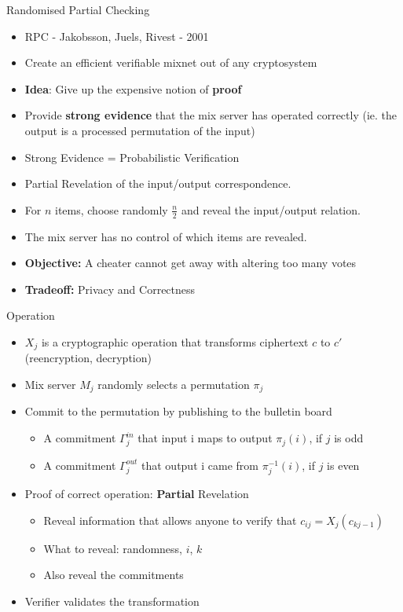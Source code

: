 \documentclass{beamer}
\begin{document}
\begin{frame}[allowframebreaks]{Randomised Partial Checking}

\begin{itemize}
\item RPC - Jakobsson, Juels, Rivest - 2001
\item Create an efficient verifiable mixnet out of any cryptosystem
\item \textbf{Idea}: Give up the expensive notion of \textbf{proof}
\item Provide \textbf{strong evidence} that the mix server has operated correctly (ie. the output is a processed permutation of the input)
\item Strong Evidence = Probabilistic Verification
\item Partial Revelation of the input/output correspondence.
\item For $n$ items, choose randomly $\frac{n}{2}$ and reveal the input/output relation.
\item The mix server has no control of which items are revealed.
\item \textbf{Objective:} A cheater cannot get away with altering too many votes
\item \textbf{Tradeoff:} Privacy and Correctness
\end{itemize}

\begin{block}{Operation}
\begin{itemize}
\item $X_j$ is a cryptographic operation that transforms ciphertext $c$ to $c'$ (reencryption, decryption)
\item Mix server $M_j$ randomly selects a permutation $\pi_j$
\item Commit to the permutation by publishing to the bulletin board
\begin{itemize}
\item A commitment $\Gamma_j^{in}$ that input i maps to output $\pi_j(i)$, if $j$ is odd
\item A commitment $\Gamma_j^{out}$ that output i came from $\pi^{-1}_j(i)$, if $j$ is even
\end{itemize}
\item Proof of correct operation: \textbf{Partial} Revelation
\begin{itemize}
\item  Reveal information that allows anyone to verify that $c_{ij}=X_j(c_{kj-1})$
\item  What to reveal: randomness, $i$, $k$
\item  Also reveal the commitments
\end{itemize}
\item Verifier validates the transformation
\end{itemize}
\end{block}


\end{frame}
\end{document}
